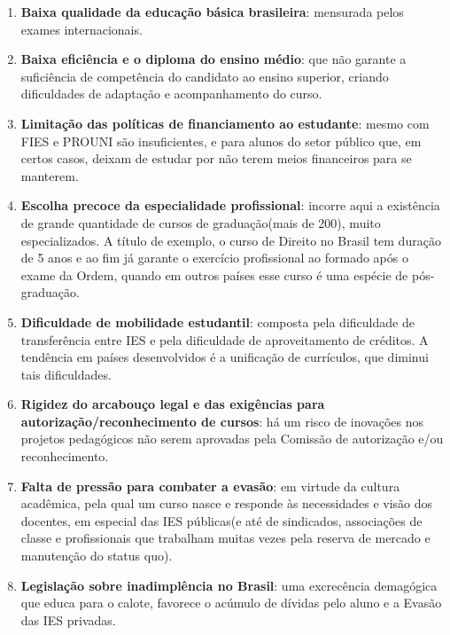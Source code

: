 \documentclass{report}
\begin{document}
\begin{enumerate}

\item \textbf{Baixa qualidade da educação básica brasileira}: mensurada pelos exames internacionais.

\item \textbf{Baixa eficiência e o diploma do ensino médio}: que não garante a suficiência de competência do candidato ao ensino superior, criando dificuldades de adaptação e acompanhamento do curso.

\item \textbf{Limitação das políticas de financiamento ao estudante}: mesmo com FIES e PROUNI são insuficientes, e para alunos do setor público que, em certos casos, deixam de estudar por não terem meios financeiros para se manterem.

\item \textbf{Escolha precoce da especialidade profissional}: incorre aqui a existência de grande quantidade de cursos de graduação(mais de 200), muito especializados. A título de exemplo, o curso de Direito no Brasil tem duração de 5 anos e ao fim já garante o exercício profissional ao formado após o exame da Ordem, quando em outros países esse curso é uma espécie de pós-graduação.

\item \textbf{Dificuldade de mobilidade estudantil}: composta pela dificuldade de transferência entre IES e pela dificuldade de aproveitamento de créditos. A tendência em países desenvolvidos é a unificação de currículos, que diminui tais dificuldades.

\item \textbf{Rigidez do arcabouço legal e das exigências para autorização/reconhecimento de cursos}: há um risco de inovações nos projetos pedagógicos não serem aprovadas pela Comissão de autorização e/ou reconhecimento.

\item \textbf{Falta de pressão para combater a evasão}: em virtude da cultura acadêmica, pela qual um curso nasce e responde às necessidades e visão dos docentes, em especial das IES públicas(e até de sindicados, associações de classe e profissionais que trabalham muitas vezes pela reserva de mercado e manutenção do status quo).

\item \textbf{Legislação sobre inadimplência no Brasil}: uma excrecência demagógica que educa para o calote, favorece o acúmulo de dívidas pelo aluno e a Evasão das IES privadas.


\end{enumerate}
\end{document}
